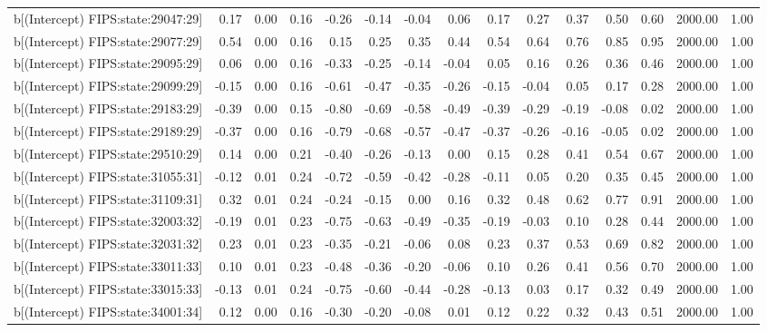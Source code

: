 \begin{table}[ht]
\begin{tabular}{rrrrrrrrrrrrrrr}
  b[(Intercept) FIPS:state:29047:29] & 0.17 & 0.00 & 0.16 & -0.26 & -0.14 & -0.04 & 0.06 & 0.17 & 0.27 & 0.37 & 0.50 & 0.60 & 2000.00 & 1.00 \\ 
  b[(Intercept) FIPS:state:29077:29] & 0.54 & 0.00 & 0.16 & 0.15 & 0.25 & 0.35 & 0.44 & 0.54 & 0.64 & 0.76 & 0.85 & 0.95 & 2000.00 & 1.00 \\ 
  b[(Intercept) FIPS:state:29095:29] & 0.06 & 0.00 & 0.16 & -0.33 & -0.25 & -0.14 & -0.04 & 0.05 & 0.16 & 0.26 & 0.36 & 0.46 & 2000.00 & 1.00 \\ 
  b[(Intercept) FIPS:state:29099:29] & -0.15 & 0.00 & 0.16 & -0.61 & -0.47 & -0.35 & -0.26 & -0.15 & -0.04 & 0.05 & 0.17 & 0.28 & 2000.00 & 1.00 \\ 
  b[(Intercept) FIPS:state:29183:29] & -0.39 & 0.00 & 0.15 & -0.80 & -0.69 & -0.58 & -0.49 & -0.39 & -0.29 & -0.19 & -0.08 & 0.02 & 2000.00 & 1.00 \\ 
  b[(Intercept) FIPS:state:29189:29] & -0.37 & 0.00 & 0.16 & -0.79 & -0.68 & -0.57 & -0.47 & -0.37 & -0.26 & -0.16 & -0.05 & 0.02 & 2000.00 & 1.00 \\ 
  b[(Intercept) FIPS:state:29510:29] & 0.14 & 0.00 & 0.21 & -0.40 & -0.26 & -0.13 & 0.00 & 0.15 & 0.28 & 0.41 & 0.54 & 0.67 & 2000.00 & 1.00 \\ 
  b[(Intercept) FIPS:state:31055:31] & -0.12 & 0.01 & 0.24 & -0.72 & -0.59 & -0.42 & -0.28 & -0.11 & 0.05 & 0.20 & 0.35 & 0.45 & 2000.00 & 1.00 \\ 
  b[(Intercept) FIPS:state:31109:31] & 0.32 & 0.01 & 0.24 & -0.24 & -0.15 & 0.00 & 0.16 & 0.32 & 0.48 & 0.62 & 0.77 & 0.91 & 2000.00 & 1.00 \\ 
  b[(Intercept) FIPS:state:32003:32] & -0.19 & 0.01 & 0.23 & -0.75 & -0.63 & -0.49 & -0.35 & -0.19 & -0.03 & 0.10 & 0.28 & 0.44 & 2000.00 & 1.00 \\ 
  b[(Intercept) FIPS:state:32031:32] & 0.23 & 0.01 & 0.23 & -0.35 & -0.21 & -0.06 & 0.08 & 0.23 & 0.37 & 0.53 & 0.69 & 0.82 & 2000.00 & 1.00 \\ 
  b[(Intercept) FIPS:state:33011:33] & 0.10 & 0.01 & 0.23 & -0.48 & -0.36 & -0.20 & -0.06 & 0.10 & 0.26 & 0.41 & 0.56 & 0.70 & 2000.00 & 1.00 \\ 
  b[(Intercept) FIPS:state:33015:33] & -0.13 & 0.01 & 0.24 & -0.75 & -0.60 & -0.44 & -0.28 & -0.13 & 0.03 & 0.17 & 0.32 & 0.49 & 2000.00 & 1.00 \\ 
  b[(Intercept) FIPS:state:34001:34] & 0.12 & 0.00 & 0.16 & -0.30 & -0.20 & -0.08 & 0.01 & 0.12 & 0.22 & 0.32 & 0.43 & 0.51 & 2000.00 & 1.00 \\ 

\end{tabular}
\end{table}
